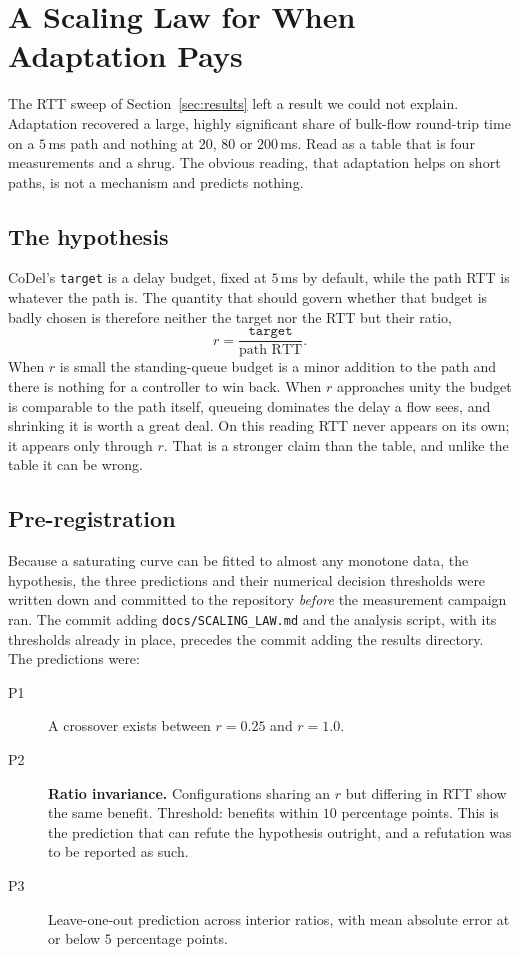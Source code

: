 \section{A Scaling Law for When Adaptation Pays}
\label{sec:law}

The RTT sweep of Section~\ref{sec:results} left a result we could not explain.
Adaptation recovered a large, highly significant share of bulk-flow round-trip
time on a $5$\,ms path and nothing at $20$, $80$ or $200$\,ms. Read as a table
that is four measurements and a shrug. The obvious reading, that adaptation
helps on short paths, is not a mechanism and predicts nothing.

\subsection{The hypothesis}

CoDel's \texttt{target} is a delay budget, fixed at $5$\,ms by default, while
the path RTT is whatever the path is. The quantity that should govern whether
that budget is badly chosen is therefore neither the target nor the RTT but
their ratio,
\begin{equation}
r = \frac{\texttt{target}}{\text{path RTT}} .
\end{equation}
When $r$ is small the standing-queue budget is a minor addition to the path and
there is nothing for a controller to win back. When $r$ approaches unity the
budget is comparable to the path itself, queueing dominates the delay a flow
sees, and shrinking it is worth a great deal. On this reading RTT never appears
on its own; it appears only through $r$. That is a stronger claim than the
table, and unlike the table it can be wrong.

\subsection{Pre-registration}

Because a saturating curve can be fitted to almost any monotone data, the
hypothesis, the three predictions and their numerical decision thresholds were
written down and committed to the repository \emph{before} the measurement
campaign ran. The commit adding \texttt{docs/SCALING\_LAW.md} and the analysis
script, with its thresholds already in place, precedes the commit adding the
results directory. The predictions were:

\begin{description}
\item[P1] A crossover exists between $r = 0.25$ and $r = 1.0$.
\item[P2] \textbf{Ratio invariance.} Configurations sharing an $r$ but
      differing in RTT show the same benefit. Threshold: benefits within $10$
      percentage points. This is the prediction that can refute the hypothesis
      outright, and a refutation was to be reported as such.
\item[P3] Leave-one-out prediction across interior ratios, with mean absolute
      error at or below $5$ percentage points.
\end{description}

